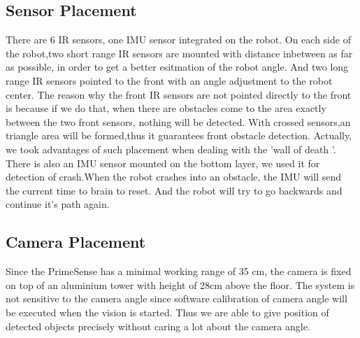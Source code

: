 \subsection{Sensor Placement}
There are 6 IR sensors, one IMU sensor integrated on the robot.
On each side of the robot,two short range IR sensors are mounted with distance inbetween as far as possible, in order to get a better esitmation of the robot angle. 
And two long range IR sensors pointed to the front with an angle adjustment to the robot center.  
The reason why the front IR sensors are not pointed directly to the front is because if we do that, when there are obstacles come to the area exactly between the two front sensors, nothing will be detected.
With crossed sensors,an triangle area will be formed,thus it guarantees front obstacle detection.
Actually, we took advantages of such placement when dealing with the 'wall of death '.\\

\setlength{\parindent}{0pt}There is also an IMU sensor mounted on the bottom layer, we used it for detection of crash.When the robot crashes into an obstacle, the IMU will send the current time to brain to reset.
And the robot will try to go backwards and continue it's path again.

\subsection{Camera Placement}
Since the PrimeSense has a minimal working range of 35 cm, the camera is fixed on top of an aluminium tower with height of 28cm above the floor. 
The system is not sensitive to the camera angle since software calibration of camera angle will be executed when the vision is started.
Thus we are able to give position of detected objects precisely without caring a lot about the camera angle.